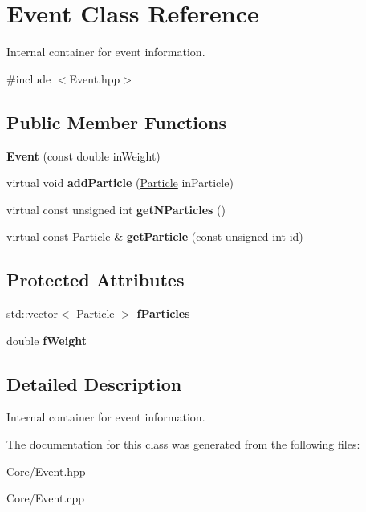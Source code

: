 \hypertarget{class_event}{\section{Event Class Reference}
\label{class_event}
}


Internal container for event information.  




{\ttfamily \#include $<$Event.\-hpp$>$}

\subsection*{Public Member Functions}
\begin{DoxyCompactItemize}
\item 
\hypertarget{class_event_a9428d9a3c1019d5d0578361a1f1b5a21}{{\bfseries Event} (const double in\-Weight)}\label{class_event_a9428d9a3c1019d5d0578361a1f1b5a21}

\item 
\hypertarget{class_event_ac03f230c76575e2823d779fc99b0a310}{virtual void {\bfseries add\-Particle} (\hyperlink{struct_particle}{Particle} in\-Particle)}\label{class_event_ac03f230c76575e2823d779fc99b0a310}

\item 
\hypertarget{class_event_af6404986f4d6025c9f91db1964b7e964}{virtual const unsigned int {\bfseries get\-N\-Particles} ()}\label{class_event_af6404986f4d6025c9f91db1964b7e964}

\item 
\hypertarget{class_event_a1386cb0d462fdebdc54f2fdbda6c9004}{virtual const \hyperlink{struct_particle}{Particle} \& {\bfseries get\-Particle} (const unsigned int id)}\label{class_event_a1386cb0d462fdebdc54f2fdbda6c9004}

\end{DoxyCompactItemize}
\subsection*{Protected Attributes}
\begin{DoxyCompactItemize}
\item 
\hypertarget{class_event_a8b6abfa709a91c4109ab52237a364229}{std\-::vector$<$ \hyperlink{struct_particle}{Particle} $>$ {\bfseries f\-Particles}}\label{class_event_a8b6abfa709a91c4109ab52237a364229}

\item 
\hypertarget{class_event_af00af833e5d897490265fb19c8578485}{double {\bfseries f\-Weight}}\label{class_event_af00af833e5d897490265fb19c8578485}

\end{DoxyCompactItemize}


\subsection{Detailed Description}
Internal container for event information. 

The documentation for this class was generated from the following files\-:\begin{DoxyCompactItemize}
\item 
Core/\hyperlink{_event_8hpp}{Event.\-hpp}\item 
Core/Event.\-cpp\end{DoxyCompactItemize}
